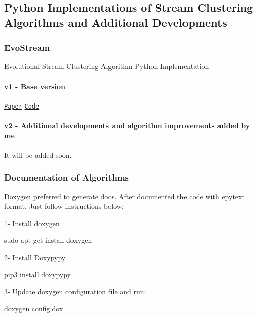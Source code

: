 \subsection*{Python Implementations of Stream Clustering Algorithms and Additional Developments }

\subsubsection*{Evo\+Stream }

Evolutional Stream Clustering Algorithm Python Implementation

\paragraph*{v1 -\/ Base version }

\href{https://www.sciencedirect.com/science/article/pii/S2214579618300649}{\tt Paper} \href{https://github.com/MatthiasCarnein/evoStream_C.git}{\tt Code}

\paragraph*{v2 -\/ Additional developments and algorithm improvements added by me }

It will be added soon.

\subsubsection*{Documentation of Algorithms}

Doxygen preferred to generate docs. After documented the code with epytext format. Just follow instructions below\+:

1-\/ Install doxygen 
\begin{DoxyCode}
sudo apt-get install doxygen
\end{DoxyCode}


2-\/ Install Doxypypy 
\begin{DoxyCode}
pip3 install doxypypy
\end{DoxyCode}


3-\/ Update doxygen configuration file and run\+:


\begin{DoxyCode}
doxygen config.dox
\end{DoxyCode}
 